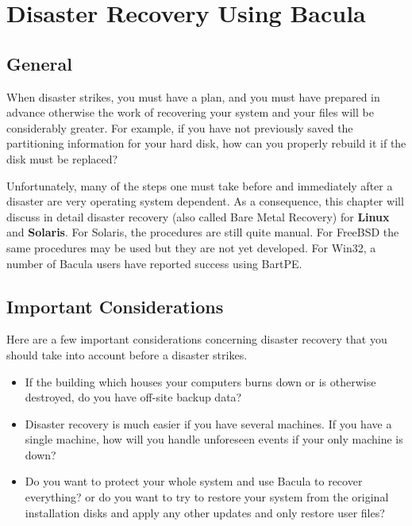 
\chapter{Disaster Recovery Using Bacula}
\label{RescueChapter}

\section{General}

When disaster strikes, you must have a plan, and you must have prepared in
advance otherwise the work of recovering your system and your files will be
considerably greater.  For example, if you have not previously saved the
partitioning information for your hard disk, how can you properly rebuild
it if the disk must be replaced?

Unfortunately, many of the steps one must take before and immediately after
a disaster are very operating system dependent.  As a consequence, this
chapter will discuss in detail disaster recovery (also called Bare Metal
Recovery) for {\bf Linux} and {\bf Solaris}.  For Solaris, the procedures
are still quite manual.  For FreeBSD the same procedures may be used but
they are not yet developed.  For Win32, a number of Bacula users have
reported success using BartPE.


\label{considerations1}
\section{Important Considerations}

Here are a few important considerations concerning disaster recovery that
you should take into account before a disaster strikes.

\begin{itemize}
\item If the building which houses your computers burns down or is otherwise 
   destroyed, do you have off-site backup data? 
\item Disaster recovery is much easier if you have several machines. If  you
   have a single machine, how will you handle unforeseen events  if your only
   machine is down? 
\item Do you want to protect your whole system and use Bacula to  recover
   everything? or do you want to try to restore your system from  the original
   installation disks and apply any other updates and  only restore user files? 
\end{itemize}

